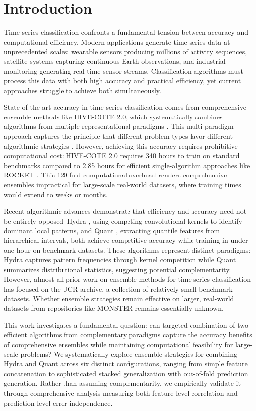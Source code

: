 \documentclass[pdflatex,sn-basic]{sn-jnl}           %
\theoremstyle{thmstyleone}%
\theoremstyle{thmstyletwo}%
\theoremstyle{thmstylethree}%
\begin{document}
\section{Introduction}\label{sec1}

Time series classification confronts a fundamental tension between accuracy and computational efficiency. Modern applications generate time series data at unprecedented scales: wearable sensors producing millions of activity sequences, satellite systems capturing continuous Earth observations, and industrial monitoring generating real-time sensor streams. Classification algorithms must process this data with both high accuracy and practical efficiency, yet current approaches struggle to achieve both simultaneously.

State of the art accuracy in time series classification comes from comprehensive ensemble methods like HIVE-COTE 2.0, which systematically combines algorithms from multiple representational paradigms \citep{hive-cote-2}. This multi-paradigm approach captures the principle that different problem types favor different algorithmic strategies \citep{tsc-bakeoff}. However, achieving this accuracy requires prohibitive computational cost: HIVE-COTE 2.0 requires 340 hours to train on standard benchmarks compared to 2.85 hours for efficient single-algorithm approaches like ROCKET \citep{hive-cote-2}. This 120-fold computational overhead renders comprehensive ensembles impractical for large-scale real-world datasets, where training times would extend to weeks or months.

Recent algorithmic advances demonstrate that efficiency and accuracy need not be entirely opposed. Hydra \citep{hydra}, using competing convolutional kernels to identify dominant local patterns, and Quant \citep{quant}, extracting quantile features from hierarchical intervals, both achieve competitive accuracy while training in under one hour on benchmark datasets. These algorithms represent distinct paradigms: Hydra captures pattern frequencies through kernel competition while Quant summarizes distributional statistics, suggesting potential complementarity. However, almost all prior work on ensemble methods for time series classification has focused on the UCR archive, a collection of relatively small benchmark datasets. Whether ensemble strategies remain effective on larger, real-world datasets from repositories like MONSTER \citep{monster} remains essentially unknown.

This work investigates a fundamental question: can targeted combination of two efficient algorithms from complementary paradigms capture the accuracy benefits of comprehensive ensembles while maintaining computational feasibility for large-scale problems? We systematically explore ensemble strategies for combining Hydra and Quant across six distinct configurations, ranging from simple feature concatenation to sophisticated stacked generalization with out-of-fold prediction generation. Rather than assuming complementarity, we empirically validate it through comprehensive analysis measuring both feature-level correlation and prediction-level error independence.
\end{document}

